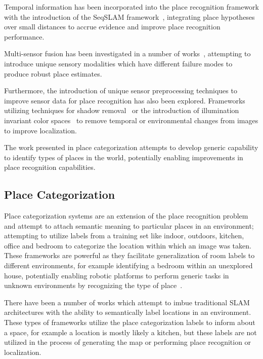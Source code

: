 \documentclass[letterpaper, 10 pt, conference]{ieeeconf}  %
\begin{document}
Temporal information has been incorporated into the place recognition framework with the introduction of the SeqSLAM framework~\cite{Milford2012}, integrating place hypotheses over small distances to accrue evidence and improve place recognition performance.

Multi-sensor fusion has been investigated in a number of works~\cite{tapus2006cognitive,Milford2013a}, attempting to introduce unique sensory modalities which have different failure modes to produce robust place estimates. 

Furthermore, the introduction of unique sensor preprocessing techniques to improve sensor data for place recognition has also been explored. Frameworks utilizing techniques for shadow removal~\cite{corke2013dealing} or the introduction of illumination invariant color spaces~\cite{mcmanus2014shady} to remove temporal or environmental changes from images to improve localization. 

The work presented in place categorization attempts to develop generic capability to identify types of places in the world, potentially enabling improvements in place recognition capabilities. 


\subsection{Place Categorization}

Place categorization systems are an extension of the place recognition problem and attempt to attach semantic meaning to particular places in an environment; attempting to utilize labels from a training set like indoor, outdoors, kitchen, office and bedroom to categorize the location within which an image was taken. These frameworks are powerful as they facilitate generalization of room labels to different environments, for example identifying a bedroom within an unexplored house, potentially enabling robotic platforms to perform generic tasks in unknown environments by recognizing the type of place~\cite{wu2009visual}. 

There have been a number of works which attempt to imbue traditional SLAM architectures with the ability to semantically label locations in an environment\cite{sunderhauf2016place, ranganathan2011visual}. These types of frameworks utilize the place categorization labels to inform about a space, for example a location is mostly likely a kitchen, but these labels are not utilized in the process of generating the map or performing place recognition or localization. 
\end{document}
